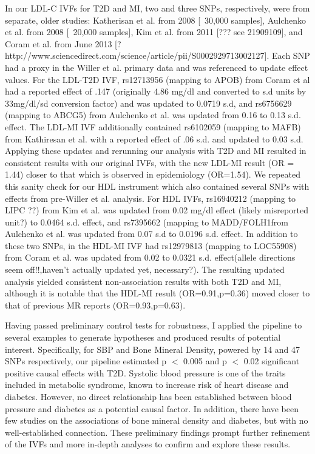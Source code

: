 In our LDL-C IVFs for T2D and MI, two and three SNPs, respectively, were from separate, older studies: Katherisan et al. from 2008 [~30,000 samples], Aulchenko et al. from 2008 [~20,000 samples], Kim et al. from 2011 [??? see 21909109], and Coram et al.  from June 2013 [?http://www.sciencedirect.com/science/article/pii/S0002929713002127]. Each SNP had a proxy in the Willer et al. primary data and was referenced to update effect values. For the LDL-T2D IVF, rs12713956 (mapping to APOB) from Coram et al had a reported effect of .147 (originally 4.86 mg/dl and converted to s.d units by 33mg/dl/sd conversion factor) and was updated to 0.0719 s.d, and  rs6756629 (mapping to ABCG5) from Aulchenko et al. was updated from 0.16 to 0.13 s.d. effect. The LDL-MI IVF additionally contained rs6102059 (mapping to MAFB) from Kathiresan et al. with a reported effect of .06 s.d. and updated to 0.03 s.d. Applying these updates and rerunning our analysis with T2D and MI resulted in consistent results with our original IVFs, with the new LDL-MI result (OR = 1.44) closer to that which is observed in epidemiology (OR=1.54). We repeated this sanity check for our HDL instrument which also contained several SNPs with effects from pre-Willer et al. analysis. For HDL IVFs, rs16940212 (mapping to LIPC ??) from Kim et al. was updated from 0.02 mg/dl effect (likely misreported unit?) to 0.0464 s.d. effect, and rs7395662 (mapping to MADD/FOLH1from Aulchenko et al. was updated from 0.07 s.d to 0.0196 s.d. effect. In addition to these two SNPs, in the HDL-MI IVF had rs12979813 (mapping to LOC55908) from Coram et al. was updated from 0.02 to 0.0321 s.d. effect(allele directions seem off!!,haven't actually updated yet, necessary?). The resulting updated analysis yielded consistent non-association results with both T2D and MI, although it is notable that the HDL-MI result (OR=0.91,p=0.36) moved closer to that of previous MR reports (OR=0.93,p=0.63). 

Having passed preliminary control tests for robustness, I applied the pipeline to several examples to generate hypotheses and produced results of potential interest. Specifically, for SBP and Bone Mineral Density, powered by 14 and 47 SNPs respectively, our pipeline estimated p $<$ 0.005 and p $<$ 0.02 significant positive causal effects with T2D. Systolic blood pressure is one of the traits included in metabolic syndrome, known to increase risk of heart disease and diabetes. However, no direct relationship has been established between blood pressure and diabetes as a potential causal factor. In addition, there have been few studies on the associations of bone mineral density and diabetes, but with no well-established connection. These preliminary findings prompt further refinement of the IVFs and more in-depth analyses to confirm and explore these results.

